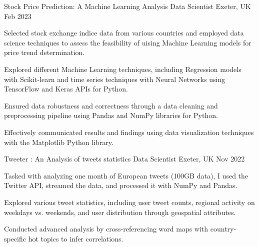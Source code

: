   
\begin{cventries}
  \cventry
  {Stock Price Prediction: A Machine Learning Analysis} %
  {Data Scientist} %
  {Exeter, UK} %
  {Feb 2023} %
  {
    \begin{cvitems} %
      \item {Selected stock exchange indice data from various countries and employed data science techniques to assess the feasibility of uising Machine Learning models for price trend determination.}
      \item{Explored different Machine Learning techniques, including Regression models with Scikit-learn and time series techniques with Neural Networks using TensorFlow and Keras APIs for Python.}
      \item{Ensured data robustness and correctness through a data cleaning and preprocessing pipeline using Pandas and NumPy libraries for Python.}
      \item{Effectively communicated results and findings using data visualization techniques with the Matplotlib Python library.}
    \end{cvitems}
  }%
  \cventry
  {Tweeter : An Analysis of tweets statistics}
  {Data Scientist}
  {Exeter, UK}
  {Nov 2022}
  {
    \begin{cvitems}
      \item {Tasked with analyzing one month of European tweets (100GB data), I used the Twitter API, streamed the data, and processed it with NumPy and Pandas.}
      \item{Explored various tweet statistics, including user tweet counts, regional activity on weekdays vs. weekends, and user distribution through geospatial attributes.}
      \item{Conducted advanced analysis by cross-referencing word maps with country-specific hot topics to infer correlations.}

\end{cvitems}}
\end{cventries}

